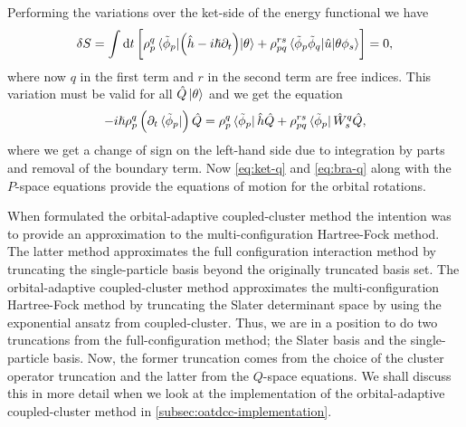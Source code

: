             Performing the variations over the ket-side of the energy functional
            we have
            \begin{align}
                \delta S
                = \int \dd t
                \left[ 
                    \rho^{q}_{p}
                    \mel*{\tilde{\phi}_p}{
                        \left( 
                            \hat{h}
                            - i\hslash \partial_t
                         \right)
                    }{\theta}
                    + \rho^{rs}_{pq}
                    \mel*{\tilde{\phi}_p\tilde{\phi}_q}{
                        \hat{u}
                    }{\theta\phi_s}
                 \right]
                = 0,
            \end{align}
            where now $q$ in the first term and $r$ in the second term are free
            indices.
            This variation must be valid for all $\hat{Q}\ket{\theta}$ and we
            get the equation
            \begin{align}
                -i\hslash\rho^{q}_{p}\left( 
                    \partial_t \bra*{\tilde{\phi}_p}
                 \right)\hat{Q}
                =
                \rho^{q}_{p}\bra*{\tilde{\phi}_p}
                \hat{h}\hat{Q}
                + \rho^{rs}_{pq}
                \bra*{\tilde{\phi}_p}
                \hat{W}^{q}_{s}\hat{Q},
                \label{eq:bra-q}
            \end{align}
            where we get a change of sign on the left-hand side due to
            integration by parts and removal of the boundary term.
            Now \autoref{eq:ket-q} and \autoref{eq:bra-q} along with the
            $P$-space equations provide the equations of motion for the orbital
            rotations.

            When \citeauthor{kvaal2012ab} formulated the orbital-adaptive
            coupled-cluster method the intention was to provide an approximation
            to the multi-configuration Hartree-Fock method.
            The latter method approximates the full configuration interaction
            method by truncating the single-particle basis beyond the originally
            truncated basis set.
            The orbital-adaptive coupled-cluster method approximates the
            multi-configuration Hartree-Fock method by truncating the Slater
            determinant space by using the exponential ansatz from
            coupled-cluster.
            Thus, we are in a position to do two truncations from the
            full-configuration method; the Slater basis and the single-particle
            basis.
            Now, the former truncation comes from the choice of the cluster
            operator truncation and the latter from the $Q$-space equations.
            We shall discuss this in more detail when we look at the
            implementation of the orbital-adaptive coupled-cluster method in
            \autoref{subsec:oatdcc-implementation}.



